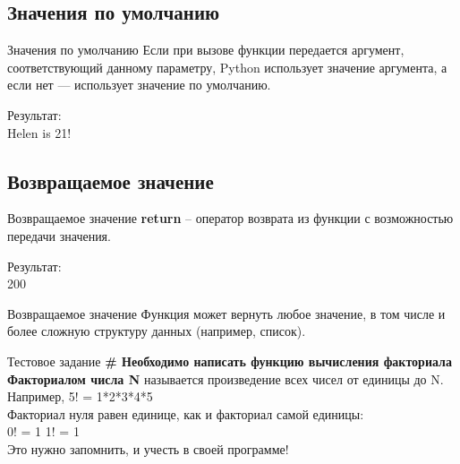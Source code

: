 \documentclass[12pt]{beamer}
\begin{document}
\subsection{Значения по умолчанию}
\begin{frame}{Значения по умолчанию}
Если при вызове функции передается аргумент, соответствующий данному параметру, Python использует значение аргумента, а если нет — использует значение по умолчанию.\\
\vspace{0.5cm}

\vspace{0.5cm}
Результат: \\
Helen is 21! \\
\end{frame}


\subsection{Возвращаемое значение}
\begin{frame}{Возвращаемое значение}
\textbf{return} -- оператор возврата из функции с возможностью передачи значения.\\
\vspace{0.5cm}

\vspace{0.5cm}
Результат: \\
200 \\
\end{frame}


\begin{frame}{Возвращаемое значение}
Функция может вернуть любое значение, в том числе и более сложную структуру данных (например, список).\\
\vspace{0.2cm}

\end{frame}


\begin{frame}{Тестовое задание}
\textbf{\# Необходимо написать функцию вычисления факториала} \\
\vspace{0.5cm}
\textbf{Факториалом числа N} называется произведение всех чисел от единицы до N. \\
\vspace{0.1cm}
Например, 5! = 1*2*3*4*5 \\
\vspace{0.1cm}
Факториал нуля равен единице, как и факториал самой единицы: \\
0! = 1  1! = 1
\\Это нужно запомнить, и учесть в своей программе!
\vspace{0.5cm}
\end{frame}
\end{document}
